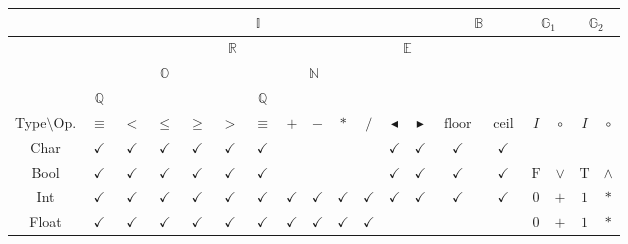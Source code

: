 \documentclass{jsarticle}
\newcommand{\htypeclassname}[1]{\mathbb{#1}}
\newcommand{\heq}{\equiv}
\newcommand{\hsucc}{\blacktriangleright}
\newcommand{\hpred}{\blacktriangleleft}
\newcommand{\hmin}{\mathop{\text{floor}}}
\newcommand{\hmax}{\mathop{\text{ceil}}}
\newcommand{\identity}{I}
\newcommand{\binaryop}{\circ}
\newcommand{\htrue}{\text{T}}
\newcommand{\hfalse}{\text{F}}
\begin{document}
\begin{center}
\begin{tabular}{||c||c|c|c|c|c|c|c|c|c|c|c|c|c|c|c|c|c|c||}
\hline
{ }
    &\multicolumn{12}{|c|}{$\htypeclassname{I}$}
    &\multicolumn{2}{|c|}{$\htypeclassname{B}$}
    &\multicolumn{2}{|c|}{$\htypeclassname{G}_1$}
    &\multicolumn{2}{|c||}{$\htypeclassname{G}_2$}\\
\hline
{ }
    &\multicolumn{10}{|c|}{$\htypeclassname{R}$}
    &\multicolumn{2}{|c|}{$\htypeclassname{E}$}
    &\multicolumn{2}{|c|}{ }
    &\multicolumn{2}{|c|}{ }
    &\multicolumn{2}{|c||}{ }\\
\hline
{ }
    &\multicolumn{5}{|c|}{$\htypeclassname{O}$}
    &\multicolumn{5}{|c|}{$\htypeclassname{N}$}
    &\multicolumn{2}{|c|}{ }
    &\multicolumn{2}{|c|}{ }
    &\multicolumn{2}{|c|}{ }
    &\multicolumn{2}{|c||}{ }\\
\hline
{ }
    &$\htypeclassname{Q}$
    &\multicolumn{4}{|c|}{ }
    &$\htypeclassname{Q}$
    &\multicolumn{4}{|c|}{ }
    &\multicolumn{2}{|c|}{ }
    &\multicolumn{2}{|c|}{ }
    &\multicolumn{2}{|c|}{ }
    &\multicolumn{2}{|c||}{ }\\
\hline
Type$\setminus$Op.
    &$\heq$
    &$<$
    &$\le$
    &$\ge$
    &$>$
    &$\equiv$
    &$+$
    &$-$
    &$*$
    &$/$
    &$\hpred$
    &$\hsucc$
    &$\hmin$
    &$\hmax$
    &$\identity$
    &$\binaryop$
    &$\identity$
    &$\binaryop$\\
\hline\hline
Char
    &$\checkmark$
    &$\checkmark$
    &$\checkmark$
    &$\checkmark$
    &$\checkmark$
    &$\checkmark$
    &
    &
    &
    &
    &$\checkmark$
    &$\checkmark$
    &$\checkmark$
    &$\checkmark$
    &
    &
    &
    &\\
\hline
Bool
    &$\checkmark$
    &$\checkmark$
    &$\checkmark$
    &$\checkmark$
    &$\checkmark$
    &$\checkmark$
    &
    &
    &
    &
    &$\checkmark$
    &$\checkmark$
    &$\checkmark$
    &$\checkmark$
    &$\hfalse$
    &$\vee$
    &$\htrue$
    &$\wedge$\\
\hline
Int
    &$\checkmark$
    &$\checkmark$
    &$\checkmark$
    &$\checkmark$
    &$\checkmark$
    &$\checkmark$
    &$\checkmark$
    &$\checkmark$
    &$\checkmark$
    &$\checkmark$
    &$\checkmark$
    &$\checkmark$
    &$\checkmark$
    &$\checkmark$
    &$0$
    &$+$
    &$1$
    &$\ast$\\
\hline
Float
    &$\checkmark$
    &$\checkmark$
    &$\checkmark$
    &$\checkmark$
    &$\checkmark$
    &$\checkmark$
    &$\checkmark$
    &$\checkmark$
    &$\checkmark$
    &$\checkmark$
    &
    &
    &
    &
    &$0$
    &$+$
    &$1$
    &$\ast$\\
\hline
\end{tabular}
\end{center}
\end{document}
